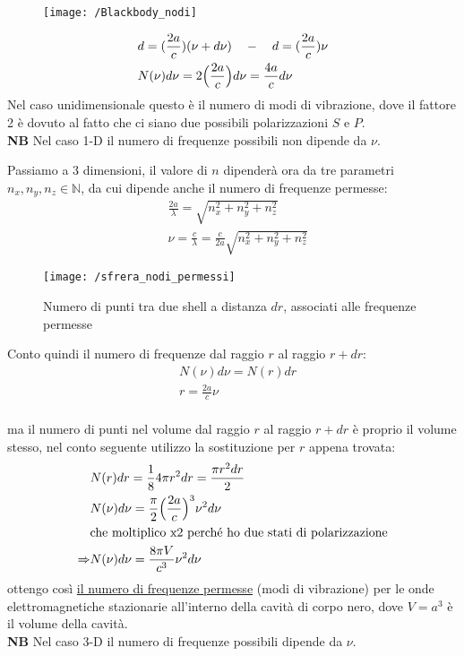 \begin{enumerate}[label=\Roman{*}.]
\begin{figure}[h]
\centering
\texttt{[image: /Blackbody\_nodi]}
\end{figure}
\begin{equation}
\begin{split}
& d = (\frac{ 2a}{c }) (\nu + d\nu) \quad - \quad d = (\frac{ 2a}{c }) \nu \\
& N(\nu)d\nu = 2 \Bigl(  \frac{2a}{c}  \Bigr) d\nu = \frac{4a}{c}d\nu 
\end{split}
\end{equation}
Nel caso unidimensionale questo è il numero di modi di vibrazione, dove il fattore 2 è dovuto al fatto che ci siano due possibili polarizzazioni $S$ e $P$. \\
\textbf{NB} Nel caso 1-D il numero di frequenze possibili non dipende da $\nu$.

Passiamo a 3 dimensioni, il valore di $n$ dipenderà ora da tre parametri $n_x, n_y, n_z \in \mathbb{N}$, da cui dipende anche il numero di frequenze permesse:
\begin{equation}
\begin{split}
& \frac{2a}{\lambda} = \sqrt{n_x^2 + n_y^2 + n_z^2} \\
& \nu = \frac{ c}{\lambda } = \frac{ c}{2a } \sqrt{n_x^2 + n_y^2 + n_z^2}
\end{split}
\end{equation}
\begin{figure}[h]
\centering
\texttt{[image: /sfrera\_nodi\_permessi]}
\caption{Numero di punti tra due shell a distanza $dr$, associati alle frequenze permesse}
\end{figure}

Conto quindi il numero di frequenze dal raggio $r$ al raggio $r + dr$:
\begin{equation}
\begin{split}
& N(\nu) d\nu = N(r)dr \\ 
& r = \frac{2a}{c}\nu \\
\end{split}
\end{equation}

ma il numero di punti nel volume dal raggio $r$ al raggio $r + dr$ è proprio il volume stesso, nel conto seguente utilizzo la sostituzione per $r$ appena trovata:
\begin{equation}
\begin{split}
& N(r) dr = \frac{ 1}{8 } 4 \pi r^2 dr = \frac{ \pi r^2 dr}{2 } \\
& N(\nu)d\nu = \frac{ \pi}{2 } \Bigl(  \frac{ 2a}{c }  \Bigr)^3 \nu^2 d\nu \\
& \mbox{che moltiplico x2 perché ho due stati di polarizzazione} \\
\Rightarrow & N(\nu) d\nu = \frac{ 8\pi V}{c^3 } \nu^2 d\nu
\end{split}
\end{equation}
ottengo così \underline{il numero di frequenze permesse} (modi di vibrazione) per le onde elettromagnetiche stazionarie all'interno della cavità di corpo nero, dove $V=a^3$ è il volume della cavità. \\
\textbf{NB} Nel caso 3-D il numero di frequenze possibili dipende da $\nu$.



\end{enumerate}
